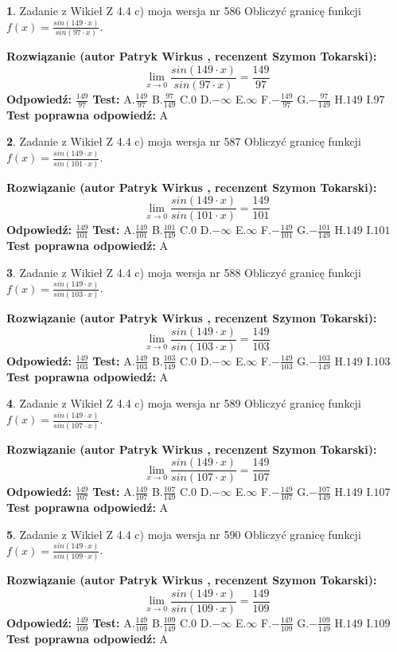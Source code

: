 \documentclass[12pt, a4paper]{article}
\theoremstyle{definition} %
\newtheorem{zad}{}
\newcommand{\zadStart}[1]{\begin{zad}#1\newline}
\newcommand{\zadStop}{\end{zad}}
\newcommand{\rozwStart}[2]{\noindent \textbf{Rozwiązanie (autor #1 , recenzent #2): }\newline}
\newcommand{\rozwStop}{\newline}
\newcommand{\odpStart}{\noindent \textbf{Odpowiedź:}\newline}
\newcommand{\odpStop}{\newline}
\newcommand{\testStart}{\noindent \textbf{Test:}\newline}
\newcommand{\testStop}{\newline}
\newcommand{\kluczStart}{\noindent \textbf{Test poprawna odpowiedź:}\newline}
\newcommand{\kluczStop}{\newline}
\begin{document}
\zadStart{Zadanie z Wikieł Z 4.4 c) moja wersja nr 586}
Obliczyć granicę funkcji $f(x)=\frac{sin(149\cdot x)}{sin(97\cdot x)}$.
\zadStop
\rozwStart{Patryk Wirkus}{Szymon Tokarski}
$$\lim\limits_{x\to 0}\frac{sin(149\cdot x)}{sin(97\cdot x)}=
\frac{149}{97}$$
\rozwStop
\odpStart
$\frac{149}{97}$
\odpStop
\testStart
A.$\frac{149}{97}$
B.$\frac{97}{149}$
C.$0$
D.$-\infty$
E.$\infty$
F.$-\frac{149}{97}$
G.$-\frac{97}{149}$
H.$149$
I.$97$
\testStop
\kluczStart
A
\kluczStop



\zadStart{Zadanie z Wikieł Z 4.4 c) moja wersja nr 587}
Obliczyć granicę funkcji $f(x)=\frac{sin(149\cdot x)}{sin(101\cdot x)}$.
\zadStop
\rozwStart{Patryk Wirkus}{Szymon Tokarski}
$$\lim\limits_{x\to 0}\frac{sin(149\cdot x)}{sin(101\cdot x)}=
\frac{149}{101}$$
\rozwStop
\odpStart
$\frac{149}{101}$
\odpStop
\testStart
A.$\frac{149}{101}$
B.$\frac{101}{149}$
C.$0$
D.$-\infty$
E.$\infty$
F.$-\frac{149}{101}$
G.$-\frac{101}{149}$
H.$149$
I.$101$
\testStop
\kluczStart
A
\kluczStop



\zadStart{Zadanie z Wikieł Z 4.4 c) moja wersja nr 588}
Obliczyć granicę funkcji $f(x)=\frac{sin(149\cdot x)}{sin(103\cdot x)}$.
\zadStop
\rozwStart{Patryk Wirkus}{Szymon Tokarski}
$$\lim\limits_{x\to 0}\frac{sin(149\cdot x)}{sin(103\cdot x)}=
\frac{149}{103}$$
\rozwStop
\odpStart
$\frac{149}{103}$
\odpStop
\testStart
A.$\frac{149}{103}$
B.$\frac{103}{149}$
C.$0$
D.$-\infty$
E.$\infty$
F.$-\frac{149}{103}$
G.$-\frac{103}{149}$
H.$149$
I.$103$
\testStop
\kluczStart
A
\kluczStop



\zadStart{Zadanie z Wikieł Z 4.4 c) moja wersja nr 589}
Obliczyć granicę funkcji $f(x)=\frac{sin(149\cdot x)}{sin(107\cdot x)}$.
\zadStop
\rozwStart{Patryk Wirkus}{Szymon Tokarski}
$$\lim\limits_{x\to 0}\frac{sin(149\cdot x)}{sin(107\cdot x)}=
\frac{149}{107}$$
\rozwStop
\odpStart
$\frac{149}{107}$
\odpStop
\testStart
A.$\frac{149}{107}$
B.$\frac{107}{149}$
C.$0$
D.$-\infty$
E.$\infty$
F.$-\frac{149}{107}$
G.$-\frac{107}{149}$
H.$149$
I.$107$
\testStop
\kluczStart
A
\kluczStop



\zadStart{Zadanie z Wikieł Z 4.4 c) moja wersja nr 590}
Obliczyć granicę funkcji $f(x)=\frac{sin(149\cdot x)}{sin(109\cdot x)}$.
\zadStop
\rozwStart{Patryk Wirkus}{Szymon Tokarski}
$$\lim\limits_{x\to 0}\frac{sin(149\cdot x)}{sin(109\cdot x)}=
\frac{149}{109}$$
\rozwStop
\odpStart
$\frac{149}{109}$
\odpStop
\testStart
A.$\frac{149}{109}$
B.$\frac{109}{149}$
C.$0$
D.$-\infty$
E.$\infty$
F.$-\frac{149}{109}$
G.$-\frac{109}{149}$
H.$149$
I.$109$
\testStop
\kluczStart
A
\kluczStop
\end{document}
